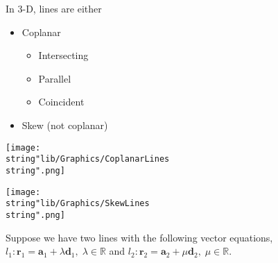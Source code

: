\documentclass[11pt,a4paper]{book}
\newcommand{\R}{\mathbb{R}}
\begin{document}
\begin{minipage}[t]{0.4\textwidth}

In 3-D, lines are either

\begin{itemize}

\item Coplanar

\begin{itemize}

\item Intersecting

\item Parallel

\item Coincident

\end{itemize}

\item Skew (not coplanar)

\end{itemize}

\end{minipage}
\begin{minipage}[t]{0.1\textwidth}
\begin{center}
\texttt{[image: \\string"lib/Graphics/CoplanarLines\\string".png]}
\par\end{center}

\end{minipage}
\begin{center}
\texttt{[image: \\string"lib/Graphics/SkewLines\\string".png]}
\par\end{center}

\begin{center}
\par\end{center}

Suppose we have two lines with the following vector equations, $l_{1}:\textbf{r}_{1}=\textbf{a}_{1}+\lambda\textbf{d}_{1},\;\lambda\in\R$
and $l_{2}:\textbf{r}_{2}=\textbf{a}_{2}+\mu\textbf{d}_{2},\;\mu\in\R$.
\end{document}

